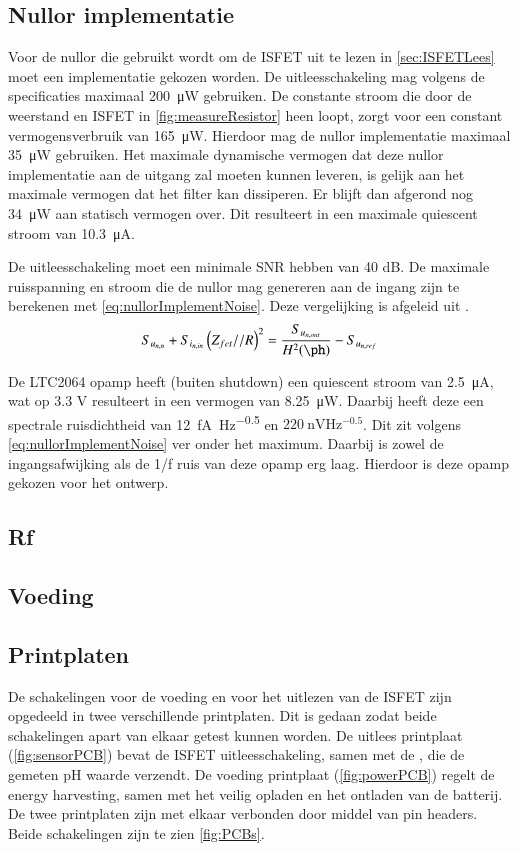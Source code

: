 \subsection{Nullor implementatie}
Voor de nullor die gebruikt wordt om de ISFET uit te lezen in \cref{sec:ISFETLees} moet een implementatie gekozen worden. De uitleesschakeling mag volgens de specificaties maximaal \qty{200}{\micro\watt}  gebruiken. De constante stroom die door de weerstand en ISFET in \cref{fig:measureResistor} heen loopt, zorgt voor een constant vermogensverbruik van \qty{165}{\micro\watt}. Hierdoor mag de nullor implementatie maximaal \qty{35}{\micro\watt} gebruiken. Het maximale dynamische vermogen dat deze nullor implementatie aan de uitgang zal moeten kunnen leveren, is gelijk aan het maximale vermogen dat het filter kan dissiperen. Er blijft dan afgerond nog \qty{34}{\micro\watt} aan statisch vermogen over. Dit resulteert in een maximale quiescent stroom van \qty{10.3}{\micro\ampere}.

De uitleesschakeling moet een minimale SNR hebben van 40 dB. De maximale ruisspanning en stroom die de nullor mag genereren aan de ingang zijn te berekenen met \cref{eq:nullorImplementNoise}. Deze vergelijking is afgeleid uit .
\begin{equation} \label{eq:nullorImplementNoise} 
    S_{u_{{n,n}}} + S_{i_{{n,in}}}\left(Z_{fet} // R\right)^2 = \frac{S_{u_{{n,out}}}}{H^2(\ph)} - S_{u_{{n,ref}}}
\end{equation}

De LTC2064 opamp heeft (buiten shutdown) een quiescent stroom van \qty{2.5}{\micro\ampere}, wat op 3.3 V resulteert in een vermogen van \qty{8.25}{\micro\watt}. Daarbij heeft deze een spectrale ruisdichtheid van \qty{12}{\femto\ampere\hertz^{-0.5}} en $\qty{220}{\nano\volt\hertz^{-0.5}}$\cite{LTC2064}. Dit zit volgens \cref{eq:nullorImplementNoise} ver onder het maximum. Daarbij is zowel de ingangsafwijking als de 1/f ruis van deze opamp erg laag. Hierdoor is deze opamp gekozen voor het ontwerp.

\subsection{Rf}


\subsection{Voeding}

\subsection{Printplaten}
De schakelingen voor de voeding en voor het uitlezen van de ISFET zijn opgedeeld in twee verschillende printplaten. Dit is gedaan zodat beide schakelingen apart van elkaar getest kunnen worden. De uitlees printplaat (\cref{fig:sensorPCB}) bevat de ISFET uitleesschakeling, samen met de \mcu, die de gemeten pH waarde verzendt. De voeding printplaat (\cref{fig:powerPCB}) regelt de energy harvesting, samen met het veilig opladen en het ontladen van de batterij. De twee printplaten zijn met elkaar verbonden door middel van pin headers. Beide schakelingen zijn te zien \cref{fig:PCBs}.

